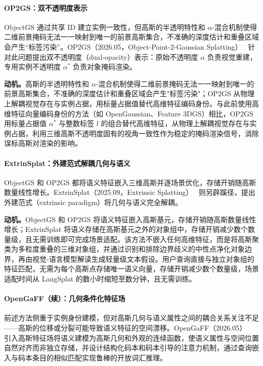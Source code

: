 \paragraph{OP2GS：双不透明度表示} ObjectGS 通过共享 ID 建立实例一致性，但高斯的半透明特性和 $\alpha$-混合机制使得二维前景掩码无法一一映射到唯一的前景高斯集合，不准确的深度估计和重叠区域会产生``标签污染''。OP2GS（2026.05，Object-Point-2-Gaussian Splatting）~\cite{2605_20044} 针对此问题提出双不透明度（dual-opacity）表示：原始不透明度 $\alpha$ 负责视觉重建，专用实例不透明度 $\alpha^*$ 负责对象掩码渲染。

\textbf{动机。}高斯的半透明特性和 $\alpha$-混合机制使得二维前景掩码无法一一映射到唯一的前景高斯集合，不准确的深度估计和重叠区域会产生"标签污染"；OP2GS 从物理上解耦视觉存在与实例占据，用标量占据值替代高维特征编码身份。与此前使用高维特征向量编码身份的方法（如 OpenGaussian、Feature 3DGS）相比，OP2GS 用标量占据值 $\alpha^*$ 与整数标签 $l$ 的组合替代高维特征，从物理上解耦视觉存在与实例占据，利用三维高斯不透明度固有的视角一致性作为稳定的掩码渲染信号，消除误标高斯对渲染的影响。

\paragraph{ExtrinSplat：外建范式解耦几何与语义} ObjectGS 和 OP2GS 都将语义特征嵌入三维高斯并逐场景优化，存储开销随高斯数量线性增长。ExtrinSplat（2025.09，Extrinsic Splatting）~\cite{2509_22225} 则另辟蹊径，提出外建范式（extrinsic paradigm）将几何与语义完全解耦。

\textbf{动机。}ObjectGS 和 OP2GS 将语义特征嵌入高斯基元，存储开销随高斯数量线性增长；ExtrinSplat 将语义存储在高斯基元之外的对象组中，存储开销减少数个数量级，且无需训练即可完成场景适配。该方法不嵌入任何高维特征，而是将高斯聚类为多粒度重叠的三维对象组，并通过识别和排除边界歧义的中性点净化对象边界，再由视觉-语言模型解读生成轻量级文本假设。用户查询直接与独立对象组的特征匹配，无需为每个高斯点存储唯一语义向量，存储开销减少数个数量级，场景适配时间从 LangSplat 的数小时缩短至数分钟，且无需训练。

\paragraph{OpenGaFF（续）：几何条件化特征场} 前述方法侧重于实例身份建模，但对高斯几何与语义属性之间的耦合关系关注不足——高斯的位移或分裂可能导致语义特征的空间漂移。OpenGaFF（2026.05）~\cite{2605_06088} 引入高斯特征场将语义建模为高斯几何和外观的连续函数，使语义属性与空间位置自然对齐而非独立存储，并设计结构化码本和码本引导的注意力机制，通过查询嵌入与码本条目的相似匹配实现鲁棒的开放词汇推理。

